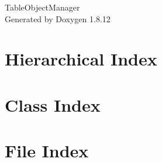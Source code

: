 \documentclass[twoside]{book}
\newcommand{\+}{\discretionary{\mbox{\scriptsize$\hookleftarrow$}}{}{}}
\newcommand{\clearemptydoublepage}{%
  \newpage{\pagestyle{empty}\cleardoublepage}%
}
\begin{document}
\hypersetup{pageanchor=false,
             bookmarksnumbered=true,
             pdfencoding=unicode
            }
\begin{titlepage}
\vspace*{7cm}
\begin{center}%
{\Large Table\+Object\+Manager }\\
\vspace*{1cm}
{\large Generated by Doxygen 1.8.12}\\
\end{center}
\end{titlepage}
\clearemptydoublepage
{}
\tableofcontents
\clearemptydoublepage
{}
\hypersetup{pageanchor=true}

\chapter{Hierarchical Index}

\chapter{Class Index}

\chapter{File Index}

\end{document}
